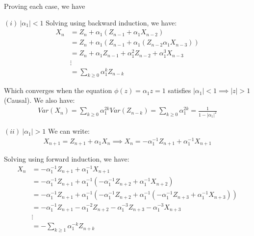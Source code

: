 \begin{proof*}
    Proving each case, we have
    
    \begin{subproof}{\newline $(i) \ |\alpha_1| < 1$}
        Solving using backward induction, we have:
        \begin{align*}
            X_n &= Z_n + \alpha_1(Z_{n-1} + \alpha_1X_{n-2}) \\
                &= Z_n + \alpha_1(Z_{n-1} + \alpha_1(Z_{n-2} \alpha_1{X_{n-3}})) \\
                &= Z_n + \alpha_1Z_{n-1} + \alpha_1^2Z_{n-2} + \alpha_1^3 X_{n-3} \\
                &\vdots \\
                &= \sum_{k\ge 0} \alpha_1^k Z_{n-k}
        \end{align*}

        \noindent Which converges when the equation $\phi(z)=\alpha_1z=1$ satisfies $|\alpha_1| < 1 \implies |z| > 1$ (Causal).
        \noindent We also have:
        \begin{align*}
            Var(X_n) = \sum_{k\ge0} \alpha_1^{2k}Var(Z_{n-k}) = \sum_{k\ge0}\alpha_1^{2k} = \frac{1}{1-|\alpha_1|^2}
        \end{align*}
    \end{subproof}

    \begin{subproof}{\newline $(ii) \ |\alpha_1| > 1$}
        We can write:
        \begin{align*}
            X_{n+1} = Z_{n+1} + \alpha_1X_n \implies X_n = -\alpha_1^{-1}Z_{n+1} + \alpha_1^{-1}X_{n+1}
        \end{align*}

        \noindent Solving using forward induction, we have:
        \begin{align*}
            X_n &= -\alpha_1^{-1}Z_{n+1} + \alpha_1^{-1}X_{n+1} \\
                &= -\alpha_1^{-1}Z_{n+1} + \alpha_1^{-1}(-\alpha_1^{-1}Z_{n+2} + \alpha_1^{-1}X_{n+2}) \\
                &= -\alpha_1^{-1}Z_{n+1} + \alpha_1^{-1}(-\alpha_1^{-1}Z_{n+2} + \alpha_1^{-1}(-\alpha_1^{-1}Z_{n+3} + \alpha_1^{-1}X_{n+3})) \\
                &= -\alpha_1^{-1}Z_{n+1} - \alpha_1^{-2}Z_{n+2} -\alpha_1^{-3}Z_{n+3}  -\alpha_1^{-3}X_{n+3} \\
                &\vdots \\
                &= -\sum_{k\ge1}\alpha_1^{-k}Z_{n+k}
        \end{align*}


\end{subproof}
\end{proof*}
